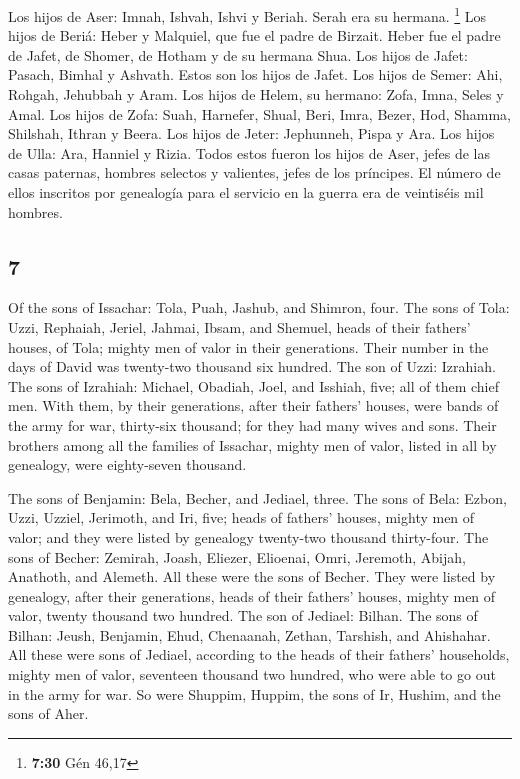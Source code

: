 \begin{paracol}{2}
 Los hijos de Aser: Imnah, Ishvah, Ishvi y Beriah. Serah
era su hermana. \footnote{\textbf{7:30} Gén 46,17}  Los
hijos de Beriá: Heber y Malquiel, que fue el padre de Birzait.
 Heber fue el padre de Jafet, de Shomer, de Hotham y de
su hermana Shua.  Los hijos de Jafet: Pasach, Bimhal y
Ashvath. Estos son los hijos de Jafet.  Los hijos de
Semer: Ahi, Rohgah, Jehubbah y Aram.  Los hijos de Helem,
su hermano: Zofa, Imna, Seles y Amal.  Los hijos de Zofa:
Suah, Harnefer, Shual, Beri, Imra,  Bezer, Hod, Shamma,
Shilshah, Ithran y Beera.  Los hijos de Jeter: Jephunneh,
Pispa y Ara.  Los hijos de Ulla: Ara, Hanniel y Rizia.
 Todos estos fueron los hijos de Aser, jefes de las casas
paternas, hombres selectos y valientes, jefes de los príncipes. El
número de ellos inscritos por genealogía para el servicio en la guerra
era de veintiséis mil hombres.

\switchcolumn
\begin{otherlanguage}{english}

\hypertarget{section-13}{%
\section{7}\label{section-13}}

 Of the sons of Issachar: Tola, Puah, Jashub, and Shimron,
four.  The sons of Tola: Uzzi, Rephaiah, Jeriel, Jahmai,
Ibsam, and Shemuel, heads of their fathers' houses, of Tola; mighty men
of valor in their generations. Their number in the days of David was
twenty-two thousand six hundred.  The son of Uzzi:
Izrahiah. The sons of Izrahiah: Michael, Obadiah, Joel, and Isshiah,
five; all of them chief men.  With them, by their
generations, after their fathers' houses, were bands of the army for
war, thirty-six thousand; for they had many wives and sons.
 Their brothers among all the families of Issachar, mighty
men of valor, listed in all by genealogy, were eighty-seven thousand.

 The sons of Benjamin: Bela, Becher, and Jediael, three.
 The sons of Bela: Ezbon, Uzzi, Uzziel, Jerimoth, and Iri,
five; heads of fathers' houses, mighty men of valor; and they were
listed by genealogy twenty-two thousand thirty-four.  The
sons of Becher: Zemirah, Joash, Eliezer, Elioenai, Omri, Jeremoth,
Abijah, Anathoth, and Alemeth. All these were the sons of Becher.
 They were listed by genealogy, after their generations,
heads of their fathers' houses, mighty men of valor, twenty thousand two
hundred.  The son of Jediael: Bilhan. The sons of Bilhan:
Jeush, Benjamin, Ehud, Chenaanah, Zethan, Tarshish, and Ahishahar.
 All these were sons of Jediael, according to the heads
of their fathers' households, mighty men of valor, seventeen thousand
two hundred, who were able to go out in the army for war.
 So were Shuppim, Huppim, the sons of Ir, Hushim, and the
sons of Aher.


\end{otherlanguage}
\end{paracol}
